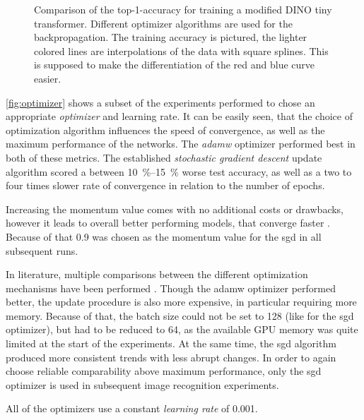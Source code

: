 \begin{figure}[htbp]
    \centering
    \caption{Comparison of the top-1-accuracy for training a modified DINO tiny transformer.
    Different optimizer algorithms are used for the backpropagation.
    The training accuracy is pictured, the lighter colored lines are interpolations of the data with square splines. 
    This is supposed to make the differentiation of the red and blue curve easier.
    }
    \label{fig:optimizer}
\end{figure}

\autoref{fig:optimizer} shows a subset of the experiments performed to chose an appropriate \emph{optimizer} and learning rate.
It can be easily seen, that the choice of optimization algorithm influences the speed of convergence, as well as the maximum performance of the networks.
The \emph{adamw} \cite{adamwOptimizer} optimizer performed best in both of these metrics.
The established \emph{stochastic gradient descent} update algorithm scored a between \SIrange[]{10}{15}{\percent} worse test accuracy, as well as a two to four times slower rate of convergence in relation to the number of epochs.

Increasing the momentum value comes with no additional costs or drawbacks, however it leads to overall better performing models, that converge faster \cite{momentum}.
Because of that \SI{0.9}{} was chosen as the momentum value for the sgd in all subsequent runs.

In literature, multiple comparisons between the different optimization mechanisms have been performed \cite{sgdOrAdamw}.
Though the adamw optimizer performed better, the update procedure is also more expensive, in particular requiring more memory.
Because of that, the batch size could not be set to 128 (like for the sgd optimizer), but had to be reduced to 64, as the available GPU memory was quite limited at the start of the experiments.
At the same time, the sgd algorithm produced more consistent trends with less abrupt changes.
In order to again choose reliable comparability above maximum performance, only the sgd optimizer is used in subsequent image recognition experiments. 

All of the optimizers use a constant \emph{learning rate} of \SI[]{0.001}{}{}.